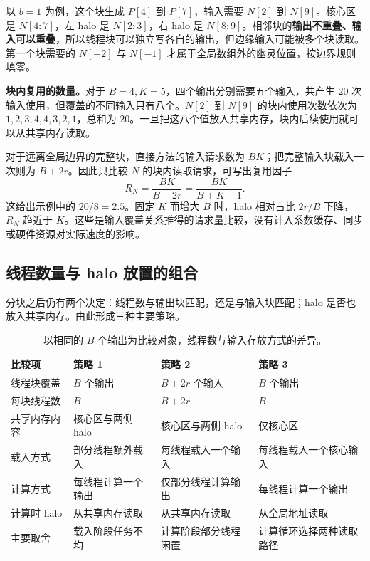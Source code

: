 以 $b=1$ 为例，这个块生成 $P[4]$ 到 $P[7]$，输入需要 $N[2]$ 到 $N[9]$。核心区是 $N[4:7]$，左 halo 是 $N[2:3]$，右 halo 是 $N[8:9]$。相邻块的\textbf{输出不重叠、输入可以重叠}，所以线程块可以独立写各自的输出，但边缘输入可能被多个块读取。第一个块需要的 $N[-2]$ 与 $N[-1]$ 才属于全局数组外的幽灵位置，按边界规则填零。

\textbf{块内复用的数量。}对于 $B=4,K=5$，四个输出分别需要五个输入，共产生 $20$ 次输入使用，但覆盖的不同输入只有八个。$N[2]$ 到 $N[9]$ 的块内使用次数依次为 $1,2,3,4,4,3,2,1$，总和为 $20$。一旦把这八个值放入共享内存，块内后续使用就可以从共享内存读取。

对于远离全局边界的完整块，直接方法的输入请求数为 $BK$；把完整输入块载入一次则为 $B+2r$。因此只比较 $N$ 的块内读取请求，可写出复用因子
\begin{equation}
 R_N=\frac{BK}{B+2r}=\frac{BK}{B+K-1}.
\label{l8:eq:reuse}
\end{equation}
这给出示例中的 $20/8=2.5$。固定 $K$ 而增大 $B$ 时，halo 相对占比 $2r/B$ 下降，$R_N$ 趋近于 $K$。这些是输入覆盖关系推得的请求量比较，没有计入系数缓存、同步或硬件资源对实际速度的影响。

\subsection{线程数量与 halo 放置的组合}
分块之后仍有两个决定：线程数与输出块匹配，还是与输入块匹配；halo 是否也放入共享内存。由此形成三种主要策略。

\begin{table}[H]
\centering\small
\begin{tabularx}{\textwidth}{@{}p{}Y Y Y@{}}
\toprule
比较项 & 策略 1 & 策略 2 & 策略 3 \\
\midrule
线程块覆盖 & $B$ 个输出 & $B+2r$ 个输入 & $B$ 个输出 \\
每块线程数 & $B$ & $B+2r$ & $B$ \\
共享内存内容 & 核心区与两侧 halo & 核心区与两侧 halo & 仅核心区 \\
载入方式 & 部分线程额外载入 & 每线程载入一个输入 & 每线程载入一个核心输入 \\
计算方式 & 每线程计算一个输出 & 仅部分线程计算输出 & 每线程计算一个输出 \\
计算时 halo & 从共享内存读取 & 从共享内存读取 & 从全局地址读取 \\
主要取舍 & 载入阶段任务不均 & 计算阶段部分线程闲置 & 计算循环选择两种读取路径 \\
\bottomrule
\end{tabularx}
\caption{以相同的 $B$ 个输出为比较对象，线程数与输入存放方式的差异。}
\end{table}

